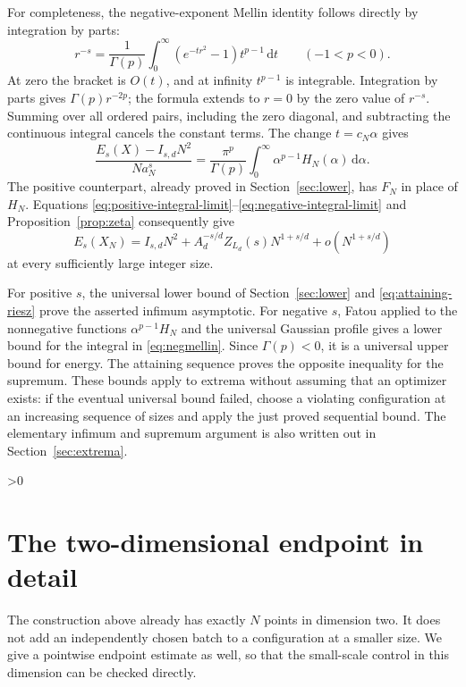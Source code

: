 \documentclass[11pt,a4paper]{article}
\theoremstyle{definition}
\newcommand{\dd}{\,\mathrm d}
\numberwithin{equation}{section}
\let\originalsection\section
\renewcommand{\section}{\ifnum\value{section}>0\clearpage\fi\originalsection}
\begin{document}
For completeness, the negative-exponent Mellin identity follows directly by integration by parts:
\begin{equation}\label{eq:negative-mellin-scalar}
 r^{-s}=\frac1{\Gamma(p)}\int_0^\infty
                 (e^{-tr^2}-1)t^{p-1}\dd t\qquad(-1<p<0).
\end{equation}
At zero the bracket is $O(t)$, and at infinity $t^{p-1}$ is integrable. Integration by parts gives $\Gamma(p)r^{-2p}$; the formula extends to $r=0$ by the zero value of $r^{-s}$. Summing over all ordered pairs, including the zero diagonal, and subtracting the continuous integral cancels the constant terms. The change $t=c_N\alpha$ gives
\begin{equation}\label{eq:negmellin}
 \frac{E_s(X)-I_{s,d}N^2}{Na_N^s}
       =\frac{\pi^p}{\Gamma(p)}
                       \int_0^\infty\alpha^{p-1}H_N(\alpha)\dd\alpha.
\end{equation}
The positive counterpart, already proved in Section~\ref{sec:lower}, has $F_N$ in place of $H_N$. Equations \eqref{eq:positive-integral-limit}--\eqref{eq:negative-integral-limit} and Proposition~\ref{prop:zeta} consequently give
\begin{equation}\label{eq:attaining-riesz}
 E_s(X_N)=I_{s,d}N^2+A_d^{-s/d}Z_{L_d}(s)N^{1+s/d}
                         +o(N^{1+s/d})
\end{equation}
at every sufficiently large integer size.

For positive $s$, the universal lower bound of Section~\ref{sec:lower} and \eqref{eq:attaining-riesz} prove the asserted infimum asymptotic. For negative $s$, Fatou applied to the nonnegative functions $\alpha^{p-1}H_N$ and the universal Gaussian profile gives a lower bound for the integral in \eqref{eq:negmellin}. Since $\Gamma(p)<0$, it is a universal upper bound for energy. The attaining sequence proves the opposite inequality for the supremum. These bounds apply to extrema without assuming that an optimizer exists: if the eventual universal bound failed, choose a violating configuration at an increasing sequence of sizes and apply the just proved sequential bound. The elementary infimum and supremum argument is also written out in Section~\ref{sec:extrema}.

\section{The two-dimensional endpoint in detail}\label{sec:negative-alln}
The construction above already has exactly $N$ points in dimension two. It does not add an independently chosen batch to a configuration at a smaller size. We give a pointwise endpoint estimate as well, so that the small-scale control in this dimension can be checked directly.
\end{document}
